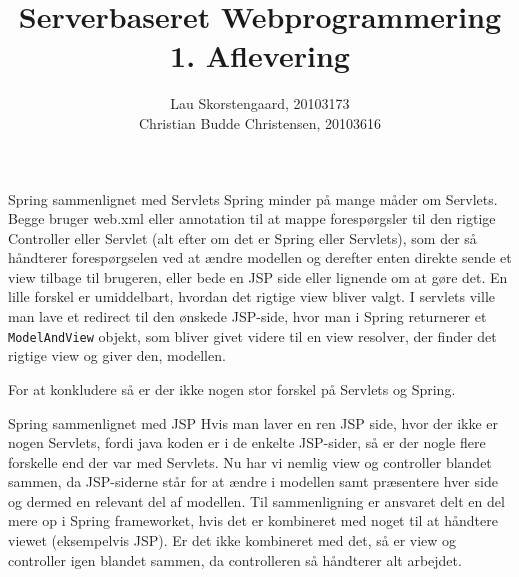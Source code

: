 \documentclass[a4paper,10pt]{article}
\author{Lau Skorstengaard, 20103173 \\Christian Budde Christensen, 20103616}
\title{Serverbaseret Webprogrammering\\1. Aflevering}
\begin{document}
\maketitle
\begin{comment}
Spring bruger web.xml til mapping i stil med JSP og Servlets (men ikke som struts og jsf, der bruger struts.xml og faces-config.xml hhv., endvidere er det muligt at lave mapping i filerne med anotation i stil med Servlets). 
Controllers i Spring er lavet i almindelige javaklasser med annotation @Controller.
Spring controller fortæller hvilken model/view der skal bruges.
I Spring er Model et map.
View kan ``udskrives'' direkte fra controller (eller man kan bruge jsp e.l. og få den til at præsentere det map man har)
Konklusion: minder lidt om servlets?
\end{comment}

Spring sammenlignet med Servlets
Spring minder på mange måder om Servlets. Begge bruger web.xml eller annotation til at mappe forespørgsler til den rigtige Controller eller Servlet (alt efter om det er Spring eller Servlets), som der så håndterer forespørgselen ved at ændre modellen og derefter enten direkte sende et view tilbage til brugeren, eller bede en JSP side eller lignende om at gøre det. En lille forskel er umiddelbart, hvordan det rigtige view bliver valgt. I servlets ville man lave et redirect til den ønskede JSP-side, hvor man i Spring returnerer et \texttt{ModelAndView} objekt, som bliver givet videre til en view resolver, der finder det rigtige view og giver den, modellen.

For at konkludere så er der ikke nogen stor forskel på Servlets og Spring.

Spring sammenlignet med JSP
Hvis man laver en ren JSP side, hvor der ikke er nogen Servlets, fordi java koden er i de enkelte JSP-sider, så er der nogle flere forskelle end der var med Servlets. Nu har vi nemlig view og controller blandet sammen, da JSP-siderne står for at ændre i modellen samt præsentere hver side og dermed en relevant del af modellen. Til sammenligning er ansvaret delt en del mere op i Spring frameworket, hvis det er kombineret med noget til at håndtere viewet (eksempelvis JSP). Er det ikke kombineret med det, så er view og controller igen blandet sammen, da controlleren så håndterer alt arbejdet.
\end{document}
